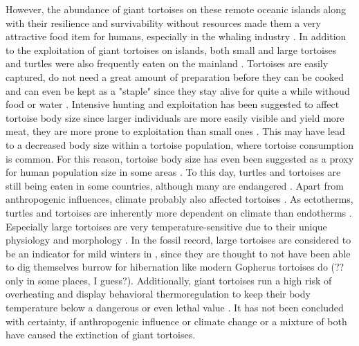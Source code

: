 
However, the abundance of giant tortoises on these remote oceanic islands along with their resilience and survivability without resources made them a very attractive food item for humans, especially in the whaling industry \citep{.}.
In addition to the exploitation of giant tortoises on islands, both small and large tortoises and turtles were also frequently eaten on the mainland \citep{.}.
Tortoises are easily captured, do not need a great amount of preparation before they can be cooked and can even be kept as a "staple" since they stay alive for quite a while withoud food or water \citep{Thompson2002,Thompson2014}. Intensive hunting and exploitation has been suggested to affect tortoise body size \citep{.} since larger individuals are more easily visible and yield more meat, they are more prone to exploitation than small ones \citep{Rhodin2015}. This may have lead to a decreased body size within a tortoise population, where tortoise consumption is common.
For this reason, tortoise body size has even been suggested as a proxy for human population size in some areas \citep{Steele2005,Stiner1999,Stiner2000}.
To this day, turtles and tortoises are still being eaten in some countries, although many are endangered \citep{.}.
Apart from anthropogenic influences, climate probably also affected tortoises \citep{.}. 
As ectotherms, turtles and tortoises are inherently more dependent on climate than endotherms \citep{.}. Especially large tortoises are very temperature-sensitive due to their unique physiology and morphology \citep{Swingland1979a, Swingland1979b}. In the fossil record, large tortoises are considered to be an indicator for mild winters in \citep{Hibbard1960,Schleich1981}, since they are thought to not have been able to dig themselves burrow for hibernation like modern Gopherus tortoises do (?? only in some places, I guess?)\citep{Carlson1999, Stojanov2009}. Additionally, giant tortoises run a high risk of overheating and display behavioral thermoregulation to keep their body temperature below a dangerous or even lethal value \citep{Sturbaum1982, Schleich1981}.
It has not been concluded with certainty, if anthropogenic influence or climate change or a mixture of both have caused the extinction of giant tortoises\citep{Rhodin2015}.

